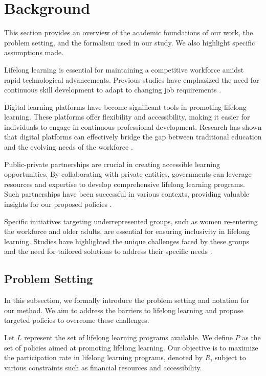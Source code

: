 \documentclass{article} %
\begin{document}
\section{Background}
\label{sec:background}

This section provides an overview of the academic foundations of our work, the problem setting, and the formalism used in our study. We also highlight specific assumptions made.

Lifelong learning is essential for maintaining a competitive workforce amidst rapid technological advancements. Previous studies have emphasized the need for continuous skill development to adapt to changing job requirements \citep{park2023generative, shanahan2023role}.

Digital learning platforms have become significant tools in promoting lifelong learning. These platforms offer flexibility and accessibility, making it easier for individuals to engage in continuous professional development. Research has shown that digital platforms can effectively bridge the gap between traditional education and the evolving needs of the workforce \citep{wang2023describe, viumdal2023industry}.

Public-private partnerships are crucial in creating accessible learning opportunities. By collaborating with private entities, governments can leverage resources and expertise to develop comprehensive lifelong learning programs. Such partnerships have been successful in various contexts, providing valuable insights for our proposed policies \citep{liu2023agentbench}.

Specific initiatives targeting underrepresented groups, such as women re-entering the workforce and older adults, are essential for ensuring inclusivity in lifelong learning. Studies have highlighted the unique challenges faced by these groups and the need for tailored solutions to address their specific needs \citep{zhou2023peer}.

\subsection{Problem Setting}
\label{sec:problem_setting}

In this subsection, we formally introduce the problem setting and notation for our method. We aim to address the barriers to lifelong learning and propose targeted policies to overcome these challenges.

Let \( L \) represent the set of lifelong learning programs available. We define \( P \) as the set of policies aimed at promoting lifelong learning. Our objective is to maximize the participation rate in lifelong learning programs, denoted by \( R \), subject to various constraints such as financial resources and accessibility.
\end{document}
